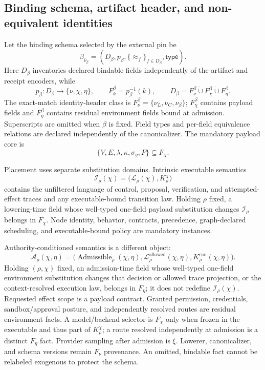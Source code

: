 \documentclass[11pt]{article}
\begin{document}
\subsection*{Binding schema, artifact header, and non-equivalent identities}

Let the binding schema selected by the external pin be
\[
\beta_{\bar\nu_\beta}
=
(D_\beta,p_\beta,
\{\approx_f\}_{f\in D_\beta},\mathsf{type}).
\]
Here \(D_\beta\) inventories declared bindable fields independently of the
artifact and receipt encoders, while
\[
p_\beta:D_\beta\rightarrow\{\nu,\chi,\eta\},
\qquad
F_k^\beta=p_\beta^{-1}(k),
\qquad
D_\beta=F_\nu^\beta\mathbin{\dot\cup}
F_\chi^\beta\mathbin{\dot\cup}F_\eta^\beta.
\]
The exact-match identity-header class is
\(F_\nu^\beta=\{\nu_L,\nu_C,\nu_\beta\}\);
\(F_\chi^\beta\) contains payload fields and \(F_\eta^\beta\) contains
residual environment fields bound at admission. Superscripts are omitted when
\(\beta\) is fixed. Field types and per-field equivalence relations are
declared independently of the canonicalizer. The mandatory payload core is
\[
  \{V,E,\lambda,\kappa,\sigma_g,P\}\subseteq F_\chi.
\]

Placement uses separate substitution domains. Intrinsic executable semantics
\[
\mathcal I_\rho(\chi)
=\bigl(\mathcal L_\rho(\chi),K_\rho^\chi\bigr)
\]
contains the unfiltered language of control, proposal, verification, and
attempted-effect traces and any executable-bound transition law. Holding
\(\rho\) fixed, a lowering-time field whose well-typed one-field payload
substitution changes \(\mathcal I_\rho\) belongs in \(F_\chi\). Node identity,
behavior, contracts, precedence, graph-declared scheduling, and
executable-bound policy are mandatory instances.

Authority-conditioned semantics is a different object:
\[
\mathcal A_\rho(\chi,\eta)
=\bigl(\operatorname{Admissible}_\rho(\chi,\eta),
\mathcal L_\rho^{\mathrm{allowed}}(\chi,\eta),
K_\rho^{\mathrm{run}}(\chi,\eta)\bigr).
\]
Holding \((\rho,\chi)\) fixed, an admission-time field whose well-typed
one-field environment substitution changes that decision or allowed trace
projection, or the context-resolved execution law, belongs in \(F_\eta\); it
does not redefine
\(\mathcal I_\rho(\chi)\). Requested effect scope is a payload contract.
Granted permission, credentials, sandbox/approval posture, and independently
resolved routes are residual environment facts. A model/backend selector is
\(F_\chi\) only when frozen in the executable and thus part of
\(K_\rho^\chi\); a route resolved independently at admission is a distinct
\(F_\eta\) fact. Provider sampling after admission is \(\xi\). Lowerer,
canonicalizer, and schema versions remain \(F_\nu\) provenance. An omitted,
bindable fact cannot be relabeled exogenous to protect the schema.
\end{document}
